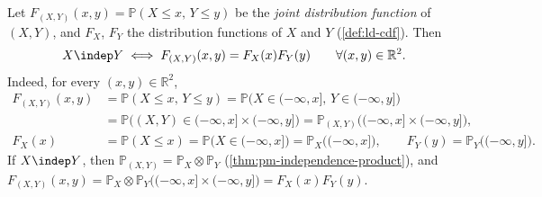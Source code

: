 \begin{remark}\label{rem:pm-cdf-independence}
Let $F_{(X,Y)}(x,y)=\mathbb P(X\le x,\,Y\le y)$ be the \emph{joint distribution function} of
$(X,Y)$, and $F_X$, $F_Y$ the distribution functions of $X$ and $Y$ (\cref{def:ld-cdf}). Then
\[
  X\indep Y\iff F_{(X,Y)}(x,y)=F_X(x)F_Y(y)\qquad\forall(x,y)\in\mathbb R^2 .
\]
Indeed, for every $(x,y)\in\mathbb R^2$,
\begin{equation}\label{eq:pm-cdf-identities}
\begin{aligned}
  F_{(X,Y)}(x,y)&=\mathbb P(X\le x,\,Y\le y)=\mathbb P\big(X\in(-\infty,x],\,Y\in(-\infty,y]\big)\\
  &=\mathbb P\big((X,Y)\in(-\infty,x]\times(-\infty,y]\big)
   =\mathbb P_{(X,Y)}\big((-\infty,x]\times(-\infty,y]\big),\\
  F_X(x)&=\mathbb P(X\le x)=\mathbb P\big(X\in(-\infty,x]\big)=\mathbb P_X\big((-\infty,x]\big),
  \qquad F_Y(y)=\mathbb P_Y\big((-\infty,y]\big).
\end{aligned}
\end{equation}
If $X\indep Y$, then $\mathbb P_{(X,Y)}=\mathbb P_X\otimes\mathbb P_Y$
(\cref{thm:pm-independence-product}), and
$F_{(X,Y)}(x,y)=\mathbb P_X\otimes\mathbb P_Y\big((-\infty,x]\times(-\infty,y]\big)=F_X(x)F_Y(y)$.


\end{remark}
